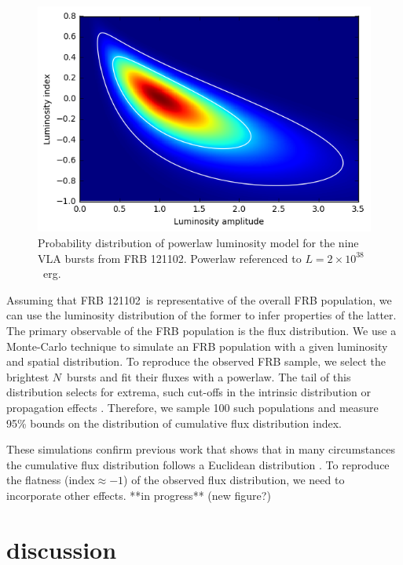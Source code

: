 \documentclass[twocolumn]{aastex61}
\newcommand{\frb}{FRB 121102}
\begin{document}
\begin{figure}[htb]
\begin{center}
\includegraphics[width=0.9\columnwidth]{luminosity_disn}
\caption{Probability distribution of powerlaw luminosity model for the nine VLA bursts from \frb. Powerlaw referenced to $L=2\times10^{38}$\ erg.
\label{fig:lumd}}
\end{center}
\end{figure}

Assuming that \frb\ is representative of the overall FRB population, we can use the luminosity distribution of the former to infer properties of the latter. The primary observable of the FRB population is the flux distribution. We use a Monte-Carlo technique to simulate an FRB population with a given luminosity and spatial distribution. To reproduce the observed FRB sample, we select the brightest $N$\ bursts and fit their fluxes with a powerlaw. The tail of this distribution selects for extrema, such cut-offs in the intrinsic distribution or propagation effects \citep{2015MNRAS.451.3278M, CORDES}. Therefore, we sample 100 such populations and measure 95\% bounds on the distribution of cumulative flux distribution index.

These simulations confirm previous work that shows that in many circumstances the cumulative flux distribution follows a Euclidean distribution \citep[index = --1.5;][]{2016MNRAS.462..941L}. To reproduce the flatness (index$\approx-1$) of the observed flux distribution, we need to incorporate other effects. 
**in progress** (new figure?)


\section{discussion}
\end{document}
